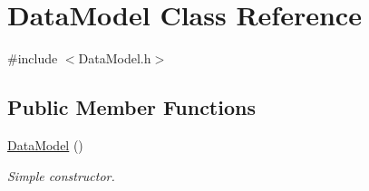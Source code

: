 \hypertarget{classDataModel}{\section{Data\-Model Class Reference}
\label{classDataModel}
}


{\ttfamily \#include $<$Data\-Model.\-h$>$}

\subsection*{Public Member Functions}
\begin{DoxyCompactItemize}
\item 
\hypertarget{classDataModel_abff03aef2cb531142a35781bb87c3365}{\hyperlink{classDataModel_abff03aef2cb531142a35781bb87c3365}{Data\-Model} ()}\label{classDataModel_abff03aef2cb531142a35781bb87c3365}

\begin{DoxyCompactList}\small\item\em Simple constructor. \end{DoxyCompactList}\end{DoxyCompactItemize}
